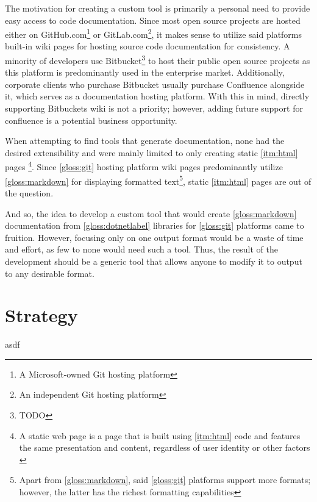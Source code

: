 The motivation for creating a custom tool is primarily a personal need to provide easy access to code documentation. Since most open source projects are hosted either on GitHub.com\footnote{A Microsoft-owned Git hosting platform} or GitLab.com\footnote{An independent Git hosting platform}, it makes sense to utilize said platforms built-in wiki pages for hosting source code documentation for consistency. A minority of developers use Bitbucket\footnote{TODO} to host their public open source projects as this platform is predominantly used in the enterprise market. Additionally, corporate clients who purchase Bitbucket usually purchase Confluence alongside it, which serves as a documentation hosting platform. With this in mind, directly supporting Bitbuckets wiki is not a priority; however, adding future support for confluence is a potential business opportunity.

When attempting to find tools that generate documentation, none had the desired extensibility and were mainly limited to only creating static \ref{itm:html} pages
\footnote{A static web page is a page that is built using \ref{itm:html} code and features the same presentation and content, regardless of user identity or other factors \cite{techopedia_what_2017}}.
Since \ref{gloss:git} hosting platform wiki pages predominantly utilize \ref{gloss:markdown} for displaying formatted text\footnote{Apart from \ref{gloss:markdown}, said \ref{gloss:git} platforms support more formats; however, the latter has the richest formatting capabilities}, static \ref{itm:html} pages are out of the question.

And so, the idea to develop a custom tool that would create \ref{gloss:markdown} documentation from \ref{gloss:dotnetlabel} libraries for \ref{gloss:git} platforms came to fruition. However, focusing only on one output format would be a waste of time and effort, as few to none would need such a tool. Thus, the result of the development should be a generic tool that allows anyone to modify it to output to any desirable format.

\section*{Strategy}
asdf
